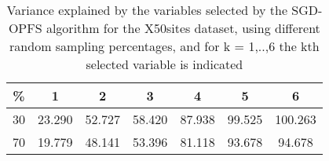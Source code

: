 \begin{table}
	\begin{center}
		\begin{tabular}{c c c c c c c}
			\% & 1 & 2 & 3 & 4 & 5 & 6 \\
			\hline
			30 & 23.290 & 52.727 & 58.420 & 87.938 & 99.525 & 100.263 \\
			70 & 19.779 & 48.141 & 53.396 & 81.118 & 93.678 & 94.678 \\
		\end{tabular}
	\end{center}
	\caption{Variance explained by the variables selected by the SGD-OPFS algorithm for the X50sites dataset, using different random sampling percentages, and for k = 1,..,6 the kth selected variable is indicated}
\end{table}